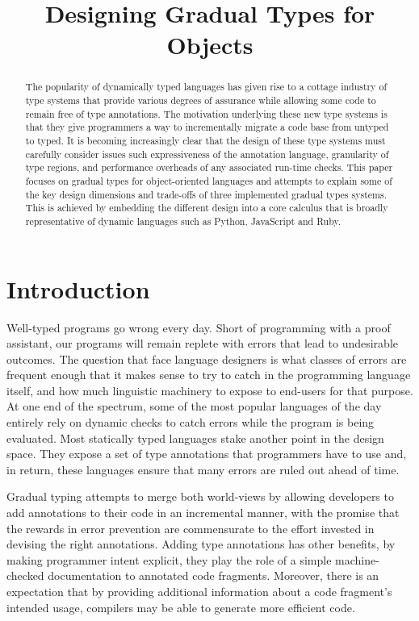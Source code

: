 \documentclass[preprint]{sigplanconf}
\begin{document}
\title{Designing Gradual Types for Objects} 
\authorinfo{}{}{} %
\maketitle

\begin{abstract}
The popularity of dynamically typed languages has given rise to a cottage
industry of type systems that provide various degrees of assurance
while allowing some code to remain free of type annotations. 
The motivation underlying these new type systems is that they give
programmers a way to incrementally migrate a code base from untyped
to typed.  It is becoming increasingly clear that the design of these
type systems must carefully consider issues such expressiveness of the 
annotation language, granularity of type regions, and performance overheads
of any associated run-time checks.  This paper focuses on gradual types for 
object-oriented languages and attempts to explain some of the key design 
dimensions and trade-offs of three implemented gradual types systems.
This is achieved by embedding the different design into a core calculus
that is broadly representative of dynamic languages such as Python, JavaScript
and Ruby.
\end{abstract} 

\section{Introduction}
Well-typed programs go wrong every day. Short of programming with a proof assistant, 
our programs will remain replete with errors that lead to undesirable outcomes. 
The question that face language designers is what classes of errors are frequent 
enough that it makes sense to try to catch in the programming language itself,
and how much linguistic machinery to expose to end-users for that purpose. 
At one end of the spectrum, some of the most popular languages of the day 
entirely rely on dynamic checks to catch errors while the program is  being 
evaluated. Most statically typed languages stake  another point in the design space. 
They expose a set of type annotations that programmers have to use and, in  return, 
these languages ensure that many errors are ruled out ahead of time.

Gradual typing attempts to merge both world-views by allowing developers to
add annotations to their code in an incremental manner, with the promise that
the rewards in error prevention are commensurate to the effort invested in
devising the right annotations. Adding type annotations has other benefits,
by making programmer intent explicit, they play the role of a simple machine-checked
documentation to annotated code fragments.  Moreover, there is an expectation that
by providing additional information about a code fragment's intended  usage,
compilers  may be able to generate more efficient code.
\end{document}
